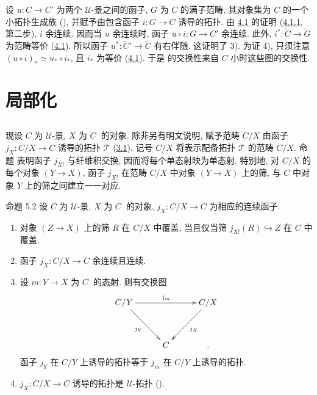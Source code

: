 设 $u:C\rightarrow C'$ 为两个 $𝒰$-景之间的函子,
$G$ 为 $C$ 的满子范畴, 其对象集为 $C$ 的一个小拓扑生成族
(),
并赋予由包含函子 $i:G\rightarrow C$ 诱导的拓扑.
由 \hyperref[III.theo4.1]{4.1} 的证明
(\hyperref[III.subsubsec4.1.1]{4.1.1}, 第二步), $i$ 余连续.
因而当 $u$ 余连续时, 函子 $u\circ i:G\rightarrow C'$ 余连续.
此外, $i^{\ast}:\widetilde{C}\rightarrow \widetilde{G}$ 为范畴等价
(\hyperref[III.theo4.1]{4.1}).
所以函子 $u^{\ast}:\widetilde{C}'\rightarrow \widetilde{C}$ 有右伴随. 这证明了 3).
为证 4), 只须注意 $(u\circ i)_{\ast}\simeq u_{\ast}\circ i_{\ast}$,
且 $i_{\ast}$ 为等价 (\hyperref[III.theo4.1]{4.1}).
于是  的交换性来自 $C$ 小时这些图的交换性.




\section{局部化}\pageoriginale

\subsection{}
现设 $C$ 为 $𝒰$-景, $X$ 为 $C^{\widehat{\phantom{,}}}$ 的对象.
除非另有明文说明, 赋予范畴 $C/X$ 由函子 $j_X:C/X\rightarrow C$ 诱导的拓扑 $𝒯$
(\hyperref[III.subsec3.1]{3.1}). 记号 $C/X$ 将表示配备拓扑 $𝒯$ 的范畴 $C/X$.
命题  表明函子 $j_{X!}$ 与纤维积交换,
因而将每个单态射映为单态射.
特别地, 对 $C/X$ 的每个对象 $(Y\rightarrow X)$,
函子 $j_{X!}$ 在范畴 $C/X$ 中对象 $(Y\rightarrow X)$ 上的筛,
与 $C$ 中对象 $Y$ 上的筛之间建立一一对应.

\begin{enonce*}{命题 5.2}
设 $C$ 为 $𝒰$-景, $X$ 为 $C^{\widehat{\phantom{,}}}$ 的对象,
$j_X:C/X\rightarrow C$ 为相应的连续函子.
\begin{enumerate}
\renewcommand{\labelenumi}{\theenumi)}
\item 对象 $(Z\rightarrow X)$ 上的筛 $R$ 在 $C/X$ 中覆盖,
当且仅当筛 $j_{X!}(R)\hookrightarrow Z$ 在 $C$ 中覆盖.

\item 函子 $j_X:C/X\rightarrow C$ 余连续且连续.

\item 设 $m:Y\rightarrow X$ 为 $C^{\widehat{\phantom{,}}}$ 的态射. 则有交换图
\[
\xymatrix@C=1cm@R=1.25cm{
C/Y \ar[rr]^{j_m} \ar[rd]_{j_Y}&       &C/X \ar[ld]^{j_X}\\
    &  C    &.
}
\]
函子 $j_Y$ 在 $C/Y$ 上诱导的拓扑等于 $j_m$ 在 $C/Y$ 上诱导的拓扑.

\item $j_X:C/X\rightarrow C$ 诱导的拓扑是 $𝒰$-拓扑
().
\end{enumerate}
\end{enonce*}

